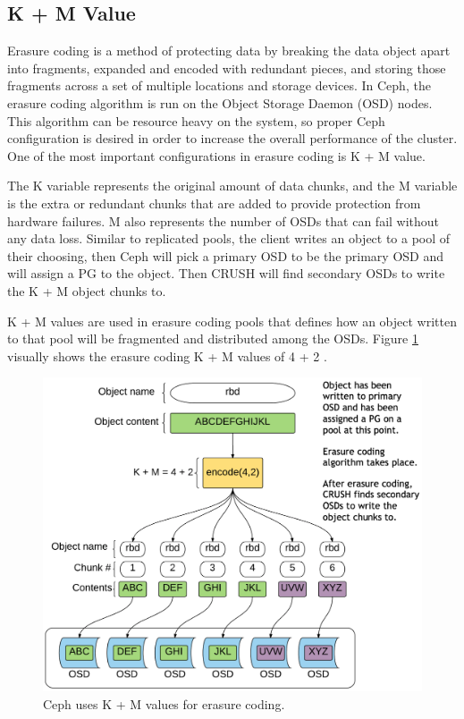 \documentclass[conference,compsoc]{IEEEtran}
\begin{document}
\subsection{K + M Value}
Erasure coding is a method of protecting data by breaking the data object apart into fragments, expanded and encoded with redundant pieces, and storing those fragments across a set of multiple locations and storage devices. In Ceph, the erasure coding algorithm is run on the Object Storage Daemon (OSD) nodes. This algorithm can be resource heavy on the system, so proper Ceph configuration is desired in order to increase the overall performance of the cluster. One of the most important configurations in erasure coding is K + M value. 

The K variable represents the original amount of data chunks, and the M variable is the extra or redundant chunks that are added to provide protection from hardware failures. M also represents the number of OSDs that can fail without any data loss. Similar to replicated pools, the client writes an object to a pool of their choosing, then Ceph will pick a primary OSD to be the primary OSD and will assign a PG to the object. Then CRUSH will find secondary OSDs to write the K + M object chunks to. 

K + M values are used in erasure coding pools that defines how an object written to that pool will be fragmented and distributed among the OSDs. Figure \ref{fig:ErasureCoding} visually shows the erasure coding K + M values of 4 + 2 \cite{greenan2007disaster}. 

\begin{figure}

\includegraphics[width=\linewidth]{ErasureCoding.png}
\caption{Ceph uses K + M values for erasure coding.}
\label{fig:ErasureCoding}

\end{figure}
\end{document}
